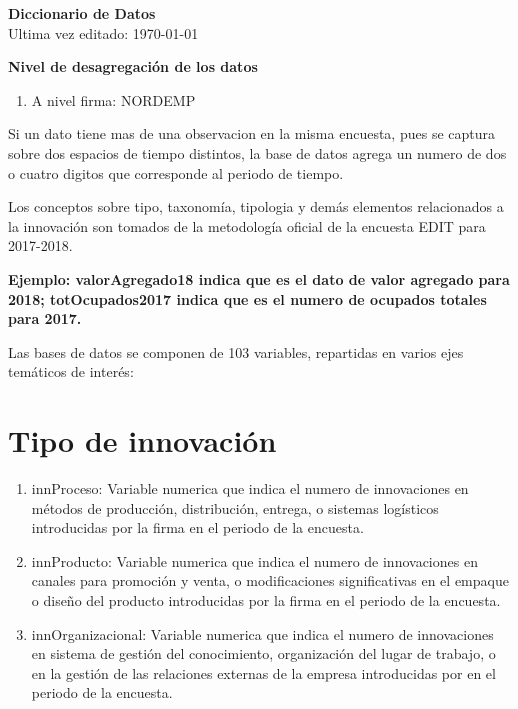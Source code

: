 \documentclass[12pt,a4paper]{article}
\begin{document}
\begin{center}
	\textbf{Diccionario de Datos} \\
	Ultima vez editado: \today
\end{center}
\vspace{10mm}

\textbf{Nivel de desagregación de los datos}
\begin{enumerate}
	\item A nivel firma: NORDEMP
\end{enumerate}

Si un dato tiene mas de una observacion en la misma encuesta, pues se captura sobre dos espacios de tiempo distintos, la base de datos agrega un numero de dos o cuatro digitos que corresponde al periodo de tiempo. 

Los conceptos sobre tipo, taxonomía, tipologia y demás elementos relacionados a la innovación son tomados de la metodología oficial de la encuesta EDIT para 2017-2018.

\begin{center}
	\textbf{\textbf{Ejemplo}: valorAgregado18 indica que es el dato de valor agregado para 2018; totOcupados2017 indica que es el numero de ocupados totales para 2017.}
\end{center}


Las bases de datos se componen de 103 variables, repartidas en varios ejes temáticos de interés:

\section{Tipo de innovación}

\begin{enumerate}
	\item innProceso: Variable numerica que indica el numero de innovaciones en métodos de producción, distribución, entrega, o sistemas logísticos introducidas por la firma en el periodo de la encuesta.
	\item innProducto: Variable numerica que indica el numero de innovaciones en canales para promoción y venta, o modificaciones significativas en el empaque o diseño del producto introducidas por la firma en el periodo de la encuesta.
	\item innOrganizacional: Variable numerica que indica el numero de innovaciones en sistema de gestión del conocimiento, organización del lugar de trabajo, o en la gestión de las relaciones externas de la empresa introducidas por  en el periodo de la encuesta.
\end{enumerate}
\end{document}
